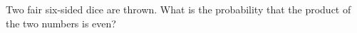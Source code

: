 Two fair six-sided dice are thrown. What is the probability that the product of the two numbers is even?
